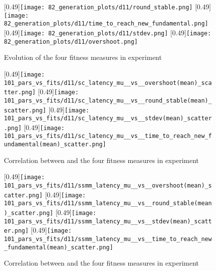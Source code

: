 \begin{figure}
	\centering
	[0.49\linewidth]{\texttt{[image: 82\_generation\_plots/d11/round\_stable.png]}}
	[0.49\linewidth]{\texttt{[image: 82\_generation\_plots/d11/time\_to\_reach\_new\_fundamental.png]}}
	[0.49\linewidth]{\texttt{[image: 82\_generation\_plots/d11/stdev.png]}}
	[0.49\linewidth]{\texttt{[image: 82\_generation\_plots/d11/overshoot.png]}}
	\caption{Evolution of the four fitness measures in experiment \deleven}
	\label{fig:d11_evolution_fitness}
\end{figure}

\begin{figure}
	\centering
	[0.49\linewidth]{\texttt{[image: 101\_pars\_vs\_fits/d11/sc\_latency\_mu\_\_vs\_\_overshoot(mean)\_scatter.png]}}
	[0.49\linewidth]{\texttt{[image: 101\_pars\_vs\_fits/d11/sc\_latency\_mu\_\_vs\_\_round\_stable(mean)\_scatter.png]}}
	[0.49\linewidth]{\texttt{[image: 101\_pars\_vs\_fits/d11/sc\_latency\_mu\_\_vs\_\_stdev(mean)\_scatter.png]}}
	[0.49\linewidth]{\texttt{[image: 101\_pars\_vs\_fits/d11/sc\_latency\_mu\_\_vs\_\_time\_to\_reach\_new\_fundamental(mean)\_scatter.png]}}
	
	\caption{Correlation between \sclatencymu and the four fitness measures in experiment \deleven}
	\label{fig:d11_parvfit_sclatencymu}
\end{figure}

\begin{figure}
	\centering
	[0.49\linewidth]{\texttt{[image: 101\_pars\_vs\_fits/d11/ssmm\_latency\_mu\_\_vs\_\_overshoot(mean)\_scatter.png]}}
	[0.49\linewidth]{\texttt{[image: 101\_pars\_vs\_fits/d11/ssmm\_latency\_mu\_\_vs\_\_round\_stable(mean)\_scatter.png]}}
	[0.49\linewidth]{\texttt{[image: 101\_pars\_vs\_fits/d11/ssmm\_latency\_mu\_\_vs\_\_stdev(mean)\_scatter.png]}}
	[0.49\linewidth]{\texttt{[image: 101\_pars\_vs\_fits/d11/ssmm\_latency\_mu\_\_vs\_\_time\_to\_reach\_new\_fundamental(mean)\_scatter.png]}}
	
	\caption{Correlation between \sclatencymu{} and the four fitness measures in experiment \deleven}
	\label{fig:d11_parvfit_ssmmlatencymu}
\end{figure}


